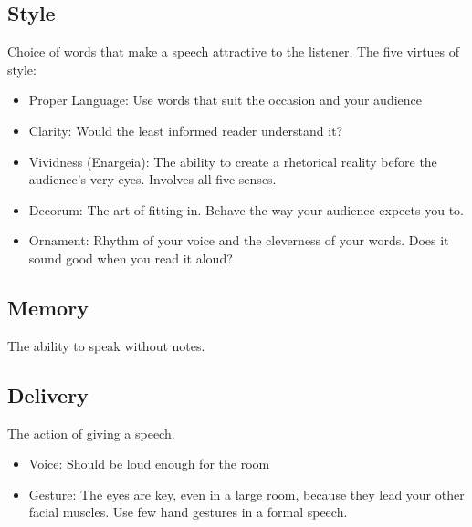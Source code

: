 \subsection{Style}
Choice of words that make a speech attractive to the listener. The five virtues of style:
\begin{itemize}
	\item Proper Language: Use words that suit the occasion and your audience
	\item Clarity: Would the least informed reader understand it?
	\item Vividness (Enargeia): The ability to create a rhetorical reality before the audience's very eyes. Involves all five senses.
	\item Decorum: The art of fitting in. Behave the way your audience expects you to.
	\item Ornament: Rhythm of your voice and the cleverness of your words. Does it sound good when you read it aloud?
\end{itemize}
	
\subsection{Memory}
The ability to speak without notes.

\subsection{Delivery}
The action of giving a speech.
\begin{itemize}
	\item Voice: Should be loud enough for the room
	\item Gesture: The eyes are key, even in a large room, because they lead your other facial muscles. Use few hand gestures in a formal speech.
\end{itemize}


